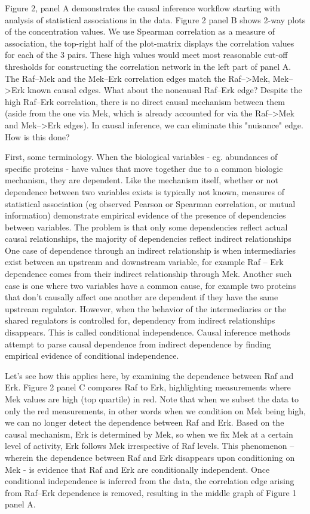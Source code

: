 \documentclass[journal=jacsat,manuscript=article]{achemso}
\begin{document}
Figure 2, panel A demonstrates the causal inference workflow starting with analysis of statistical associations in the data.  Figure 2 panel B shows 2-way plots of the concentration values.  We use Spearman correlation as a measure of association, the top-right half of the plot-matrix displays  the correlation values for each of the 3 pairs.  These high values would meet most reasonable cut-off thresholds for constructing the correlation network in the left part of panel A.  The Raf--Mek and the Mek--Erk correlation edges match the Raf-->Mek, Mek-->Erk known causal edges.  What about the noncausal Raf--Erk edge? Despite the high Raf--Erk correlation, there is no direct causal mechanism between them (aside from the one via Mek, which is already accounted for via the Raf-->Mek and Mek-->Erk edges).  In causal  inference, we can eliminate this "nuisance" edge.  How is this done?

First, some terminology.  When the biological variables  - eg. abundances of specific proteins - have values that move together due to a common biologic mechanism, they are dependent.  Like the mechanism itself, whether or not dependence between two variables exists is typically not known, measures of statistical association (eg  observed Pearson or Spearman correlation, or mutual information) demonstrate empirical evidence of the presence of dependencies between variables.  The problem is that only some  dependencies reflect actual causal relationships, the majority of dependencies reflect indirect relationships One case of dependence through an indirect relationship is when intermediaries exist between an upstream and downstream variable, for example Raf -- Erk dependence comes from their indirect relationship through Mek.  Another such case is one where two variables have a common cause, for example two proteins that don't causally affect one another are dependent if they have the same upstream regulator.  However, when the behavior of the intermediaries or the shared regulators is controlled for, dependency from indirect relationships disappears.  This is called conditional independence.  Causal inference methods attempt to parse causal dependence from indirect dependence by finding empirical evidence of conditional independence. 

Let's see how this applies here, by examining the dependence between Raf and Erk.  Figure 2 panel C compares Raf to Erk, highlighting measurements where Mek values are high (top quartile) in red.  Note that when we subset the data to only the red measurements, in other words when we condition on Mek being high, we can no longer detect the dependence between Raf and Erk.  Based on the causal mechanism, Erk is determined by Mek, so when we fix Mek at a certain level of activity, Erk follows Mek irrespective of Raf levels.  This phenomenon -- wherein the dependence between Raf and Erk disappears upon conditioning on Mek - is evidence that  Raf and Erk are conditionally independent.  Once conditional independence is inferred from the data, the correlation edge arising from Raf--Erk dependence is removed, resulting in the middle graph of Figure 1 panel A.
\end{document}
